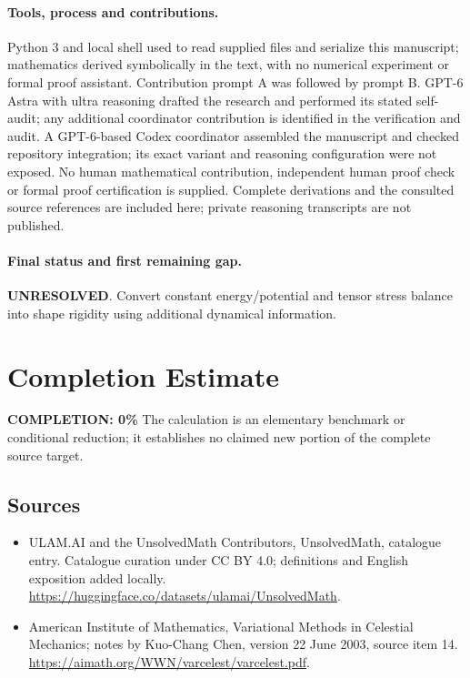 \documentclass[11pt]{article}
\begin{document}
\paragraph{Tools, process and contributions.}
Python 3 and local shell used to read supplied files and serialize this manuscript; mathematics derived symbolically in the text, with no numerical experiment or formal proof assistant. Contribution prompt A was followed by prompt B. GPT-6 Astra with ultra reasoning drafted the research and performed its stated self-audit; any additional coordinator contribution is identified in the verification and audit. A GPT-6-based Codex coordinator assembled the manuscript and checked repository integration; its exact variant and reasoning configuration were not exposed. No human mathematical contribution, independent human proof check or formal proof certification is supplied. Complete derivations and the consulted source references are included here; private reasoning transcripts are not published.

\paragraph{Final status and first remaining gap.}
\textbf{UNRESOLVED}. Convert constant energy/potential and tensor stress balance into shape rigidity using additional dynamical information.

\section{Completion Estimate}
\noindent\textbf{COMPLETION: 0\%}
The calculation is an elementary benchmark or conditional reduction; it establishes no claimed new portion of the complete source target.

\subsection{Sources}
\begin{itemize}
\item[\hypertarget{source:statement:1}{S1}] ULAM.AI and the UnsolvedMath Contributors, UnsolvedMath, catalogue entry. Catalogue curation under CC BY 4.0; definitions and English exposition added locally.
\url{https://huggingface.co/datasets/ulamai/UnsolvedMath}.
\item[\hypertarget{source:statement:2}{S2}] American Institute of Mathematics, Variational Methods in Celestial Mechanics; notes by Kuo-Chang Chen, version 22 June 2003, source item 14.
\url{https://aimath.org/WWN/varcelest/varcelest.pdf}.
\end{itemize}
\label{end:statement}
\end{document}
